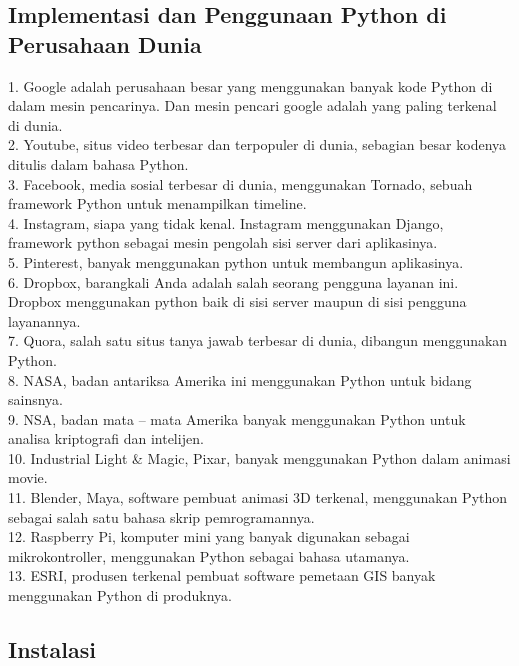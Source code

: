 \subsection{Implementasi dan Penggunaan Python di Perusahaan Dunia}
1.	Google adalah perusahaan besar yang menggunakan banyak kode Python di dalam mesin pencarinya. Dan mesin pencari google adalah yang paling terkenal di dunia.\\
2.	Youtube, situs video terbesar dan terpopuler di dunia, sebagian besar kodenya ditulis dalam bahasa Python.\\
3.	Facebook, media sosial terbesar di dunia, menggunakan Tornado, sebuah framework Python untuk menampilkan timeline.\\
4.	Instagram, siapa yang tidak kenal. Instagram menggunakan Django, framework python sebagai mesin pengolah sisi server dari aplikasinya.\\
5.	Pinterest, banyak menggunakan python untuk membangun aplikasinya.\\
6.	Dropbox, barangkali Anda adalah salah seorang pengguna layanan ini. Dropbox menggunakan python baik di sisi server maupun di sisi pengguna layanannya.\\
7.	Quora, salah satu situs tanya jawab terbesar di dunia, dibangun menggunakan Python.\\
8.	NASA, badan antariksa Amerika ini menggunakan Python untuk bidang sainsnya.\\
9.	NSA, badan mata – mata Amerika banyak menggunakan Python untuk analisa kriptografi dan intelijen.\\
10.	Industrial Light & Magic, Pixar, banyak menggunakan Python dalam animasi movie.\\
11.	Blender, Maya, software pembuat animasi 3D terkenal, menggunakan Python sebagai salah satu bahasa skrip pemrogramannya.\\
12.	Raspberry Pi, komputer mini yang banyak digunakan sebagai mikrokontroller, menggunakan Python sebagai bahasa utamanya.\\
13.	ESRI, produsen terkenal pembuat software pemetaan GIS banyak menggunakan Python di produknya.\\

\subsection{Instalasi}
